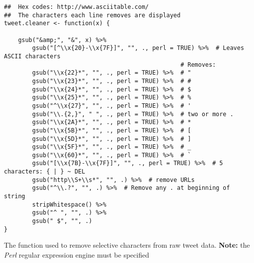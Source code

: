 \documentclass{article}
\begin{document}
\begin{listing}[H]
\begin{verbatim}
##  Hex codes: http://www.asciitable.com/
##  The characters each line removes are displayed
tweet.cleaner <- function(x) {

    gsub("&amp;", "&", x) %>%
        gsub("[^\\x{20}-\\x{7F}]", "", ., perl = TRUE) %>%  # Leaves ASCII characters
                                                  # Removes:
        gsub("\\x{22}*", "", ., perl = TRUE) %>%  # "        
        gsub("\\x{23}*", "", ., perl = TRUE) %>%  # #           
        gsub("\\x{24}*", "", ., perl = TRUE) %>%  # $
        gsub("\\x{25}*", "", ., perl = TRUE) %>%  # %
        gsub("^\\x{27}", "", ., perl = TRUE) %>%  # '                
        gsub("\\.{2,}", " ", ., perl = TRUE) %>%  # two or more .
        gsub("\\x{2A}*", "", ., perl = TRUE) %>%  # *
        gsub("\\x{5B}*", "", ., perl = TRUE) %>%  # [
        gsub("\\x{5D}*", "", ., perl = TRUE) %>%  # ]
        gsub("\\x{5F}*", "", ., perl = TRUE) %>%  # _
        gsub("\\x{60}*", "", ., perl = TRUE) %>%  # `
        gsub("[\\x{7B}-\\x{7F}]", "", ., perl = TRUE) %>%  # 5 characters: { | } ~ DEL
        gsub("http\\S+\\s*", "", .) %>%  # remove URLs
        gsub("^\\.?", "", .) %>%  # Remove any . at beginning of string
        stripWhitespace() %>%
        gsub("^ ", "", .) %>%
        gsub(" $", "", .)
}
\end{verbatim}
\caption{\label{mycode:tweet-cleaner}The function used to remove selective characters from raw tweet data. \textbf{Note:} the \emph{Perl} regular expression engine must be specified}
\end{listing}
\end{document}
